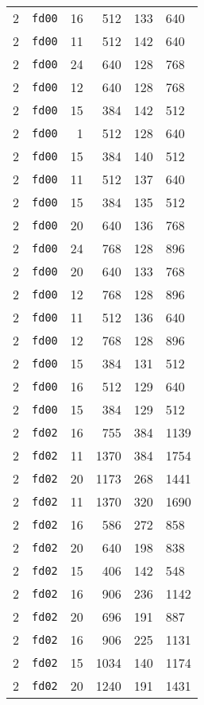 \documentclass{article}
\begin{document}
\begin{table}[h!]
\begin{tabular}{llrrrl}
    2 & \texttt{fd00} & 16 & 512 & 133 & 640 \\
    2 & \texttt{fd00} & 11 & 512 & 142 & 640 \\
    2 & \texttt{fd00} & 24 & 640 & 128 & 768 \\
    2 & \texttt{fd00} & 12 & 640 & 128 & 768 \\
    2 & \texttt{fd00} & 15 & 384 & 142 & 512 \\
    2 & \texttt{fd00} & 1 & 512 & 128 & 640 \\
    2 & \texttt{fd00} & 15 & 384 & 140 & 512 \\
    2 & \texttt{fd00} & 11 & 512 & 137 & 640 \\
    2 & \texttt{fd00} & 15 & 384 & 135 & 512 \\
    2 & \texttt{fd00} & 20 & 640 & 136 & 768 \\
    2 & \texttt{fd00} & 24 & 768 & 128 & 896 \\
    2 & \texttt{fd00} & 20 & 640 & 133 & 768 \\
    2 & \texttt{fd00} & 12 & 768 & 128 & 896 \\
    2 & \texttt{fd00} & 11 & 512 & 136 & 640 \\
    2 & \texttt{fd00} & 12 & 768 & 128 & 896 \\
    2 & \texttt{fd00} & 15 & 384 & 131 & 512 \\
    2 & \texttt{fd00} & 16 & 512 & 129 & 640 \\
    2 & \texttt{fd00} & 15 & 384 & 129 & 512 \\
    2 & \texttt{fd02} & 16 & 755 & 384 & 1139 \\
    2 & \texttt{fd02} & 11 & 1370 & 384 & 1754 \\
    2 & \texttt{fd02} & 20 & 1173 & 268 & 1441 \\
    2 & \texttt{fd02} & 11 & 1370 & 320 & 1690 \\
    2 & \texttt{fd02} & 16 & 586 & 272 & 858 \\
    2 & \texttt{fd02} & 20 & 640 & 198 & 838 \\
    2 & \texttt{fd02} & 15 & 406 & 142 & 548 \\
    2 & \texttt{fd02} & 16 & 906 & 236 & 1142 \\
    2 & \texttt{fd02} & 20 & 696 & 191 & 887 \\
    2 & \texttt{fd02} & 16 & 906 & 225 & 1131 \\
    2 & \texttt{fd02} & 15 & 1034 & 140 & 1174 \\
    2 & \texttt{fd02} & 20 & 1240 & 191 & 1431 \\

\end{tabular}
\end{table}
\end{document}
